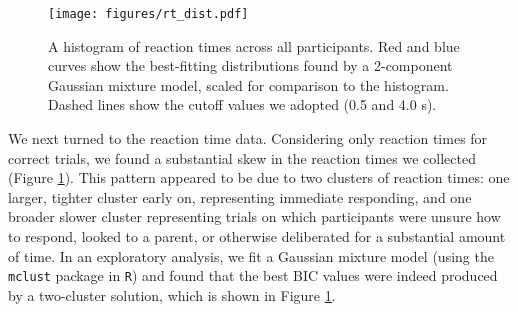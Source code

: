\documentclass[man,noapacite]{apa2}
\begin{document}



\begin{figure}[t] 
  \begin{center} 
    \texttt{[image: figures/rt\_dist.pdf]} 
    \caption{\label{fig:rtdist} A histogram of reaction times across all participants. Red and blue curves show the best-fitting distributions found by a 2-component Gaussian mixture model, scaled for comparison to the histogram. Dashed lines show the cutoff values we adopted (0.5 and 4.0 s).}
  \end{center} 
\end{figure}

We next turned to the reaction time data. Considering only reaction times for correct trials, we found a substantial skew in the reaction times we collected (Figure \ref{fig:rtdist}). This pattern appeared to be due to two clusters of reaction times: one larger, tighter cluster early on, representing immediate responding, and one broader slower cluster representing trials on which participants were unsure how to respond, looked to a parent, or otherwise deliberated for a substantial amount of time. In an exploratory analysis, we fit a Gaussian mixture model (using the \texttt{mclust} package in \texttt{R}) and found that the best BIC values were indeed produced by a two-cluster solution, which is shown in Figure \ref{fig:rtdist}. 
\end{document}

